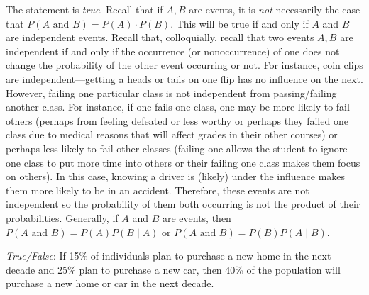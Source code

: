 \documentclass[11pt,letterpaper]{article}
\begin{document}
\sol The statement is \textit{true}. Recall that if $A, B$ are events, it is \textit{not} necessarily the case that $P(A \text{ and } B)= P(A) \cdot P(B)$. This will be true if and only if $A$ and $B$ are independent events. Recall that, colloquially, recall that two events $A, B$ are independent if and only if the occurrence (or nonoccurrence) of one does not change the probability of the other event occurring or not. For instance, coin clips are independent---getting a heads or tails on one flip has no influence on the next. However, failing one particular class is not independent from passing/failing another class. For instance, if one fails one class, one may be more likely to fail others (perhaps from feeling defeated or less worthy or perhaps they failed one class due to medical reasons that will affect grades in their other courses) or perhaps less likely to fail other classes (failing one allows the student to ignore one class to put more time into others or their failing one class makes them focus on others). In this case, knowing a driver is (likely) under the influence makes them more likely to be in an accident. Therefore, these events are not independent so the probability of them both occurring is not the product of their probabilities. Generally, if $A$ and $B$ are events, then $P(A \text{ and } B)= P(A) P(B \;|\; A)$ or $P(A \text{ and } B)= P(B) P(A \;|\; B)$. \pvspace{1.3cm}



\quizsol \textit{True/False}: If 15\% of individuals plan to purchase a new home in the next decade and 25\% plan to purchase a new car, then 40\% of the population will purchase a new home or car in the next decade. \pspace
\end{document}
